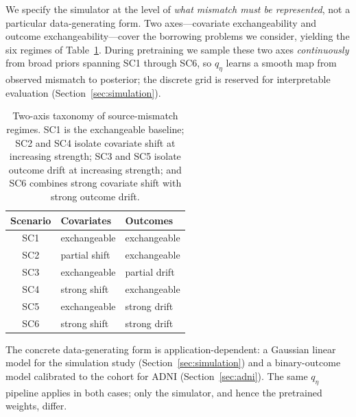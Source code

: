 We specify the simulator at the level of \emph{what mismatch must be
represented}, not a particular data-generating form.
Two axes---covariate exchangeability and outcome exchangeability---cover
the borrowing problems we consider, yielding the six regimes of
Table~\ref{tab:regimes}. During pretraining we sample these two axes
\emph{continuously} from broad priors spanning SC1 through SC6, so
$q_\eta$ learns a smooth map from observed mismatch to posterior; the
discrete grid is reserved for interpretable evaluation
(Section~\ref{sec:simulation}).

\begin{table}[t]
\centering
\small
\begin{tabular}{cll}
\toprule
Scenario & Covariates & Outcomes \\
\midrule
SC1 & exchangeable        & exchangeable \\
SC2 & partial shift       & exchangeable \\
SC3 & exchangeable        & partial drift \\
SC4 & strong shift        & exchangeable \\
SC5 & exchangeable        & strong drift \\
SC6 & strong shift        & strong drift \\
\bottomrule
\end{tabular}
\caption{Two-axis taxonomy of source-mismatch regimes. SC1 is the
exchangeable baseline; SC2 and SC4 isolate covariate shift at increasing
strength; SC3 and SC5 isolate outcome drift at increasing strength; and SC6
combines strong covariate shift with strong outcome drift.}
\label{tab:regimes}
\end{table}

The concrete data-generating form is application-dependent: a Gaussian
linear model for the simulation study (Section~\ref{sec:simulation})
and a binary-outcome model calibrated to the cohort for ADNI
(Section~\ref{sec:adni}). The same $q_\eta$ pipeline applies in both
cases; only the simulator, and hence the pretrained weights, differ.
